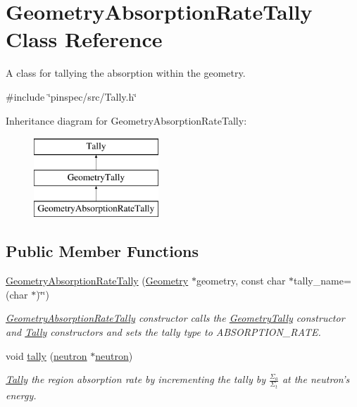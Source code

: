 \hypertarget{classGeometryAbsorptionRateTally}{\section{Geometry\-Absorption\-Rate\-Tally Class Reference}
\label{classGeometryAbsorptionRateTally}
}


A class for tallying the absorption within the geometry.  




{\ttfamily \#include \char`\"{}pinspec/src/\-Tally.\-h\char`\"{}}

Inheritance diagram for Geometry\-Absorption\-Rate\-Tally\-:\begin{figure}[H]
\begin{center}
\leavevmode
\includegraphics[height=3.000000cm]{classGeometryAbsorptionRateTally}
\end{center}
\end{figure}
\subsection*{Public Member Functions}
\begin{DoxyCompactItemize}
\item 
\hyperlink{classGeometryAbsorptionRateTally_ae5cc5e22df7445ae8ae9248dc768eb99}{Geometry\-Absorption\-Rate\-Tally} (\hyperlink{classGeometry}{Geometry} $\ast$geometry, const char $\ast$tally\-\_\-name=(char $\ast$)\char`\"{}\char`\"{})
\begin{DoxyCompactList}\small\item\em \hyperlink{classGeometryAbsorptionRateTally}{Geometry\-Absorption\-Rate\-Tally} constructor calls the \hyperlink{classGeometryTally}{Geometry\-Tally} constructor and \hyperlink{classTally}{Tally} constructors and sets the tally type to A\-B\-S\-O\-R\-P\-T\-I\-O\-N\-\_\-\-R\-A\-T\-E. \end{DoxyCompactList}\item 
void \hyperlink{classGeometryAbsorptionRateTally_a51490d9c5ee4a9d0447b6722a65fef1a}{tally} (\hyperlink{structneutron}{neutron} $\ast$\hyperlink{structneutron}{neutron})
\begin{DoxyCompactList}\small\item\em \hyperlink{classTally}{Tally} the region absorption rate by incrementing the tally by $ \frac{\Sigma_a}{\Sigma_t} $ at the neutron's energy. \end{DoxyCompactList}\end{DoxyCompactItemize}
